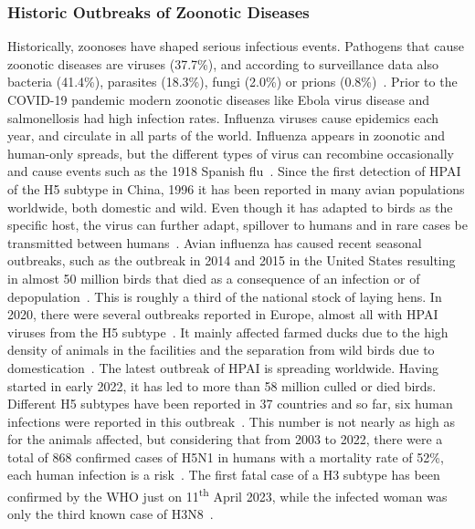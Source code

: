 \subsubsection*{Historic Outbreaks of Zoonotic Diseases}
Historically, zoonoses have shaped serious infectious events. Pathogens that cause zoonotic diseases are viruses (37.7\%), and according to surveillance data also bacteria (41.4\%), parasites (18.3\%), fungi (2.0\%) or prions (0.8\%)~\cite{salyer2017prioritizing}. Prior to the \ac{COVID-19} pandemic modern zoonotic diseases like Ebola virus disease and salmonellosis had high infection rates. Influenza viruses cause epidemics each year, and circulate in all parts of the world. Influenza appears in zoonotic and human-only spreads, but the different types of virus can recombine occasionally and cause events such as the 1918 Spanish flu~\cite{garten2009antigenic, gibbs2001recombination}. Since the first detection of \ac{HPAI} of the H5 subtype in China, 1996 it has been reported in many avian populations worldwide, both domestic and wild. Even though it has adapted to birds as the specific host, the virus can further adapt, spillover to humans and in rare cases be transmitted between humans~\cite{webster1992evolution}. Avian influenza has caused recent seasonal outbreaks, such as the outbreak in 2014 and 2015 in the United States resulting in almost 50 million birds that died as a consequence of an infection or of depopulation~\cite{lee2016highly}. This is roughly a third of the national stock of laying hens. In 2020, there were several outbreaks reported in Europe, almost all with \ac{HPAI} viruses from the H5 subtype~\cite{lewis2021emergence}. It mainly affected farmed ducks due to the high density of animals in the facilities and the separation from wild birds due to domestication~\cite{lewis2021emergence}. The latest outbreak of \ac{HPAI} is spreading worldwide. Having started in early 2022, it has led to more than 58 million culled or died birds. Different H5 subtypes have been reported in 37 countries and so far, six human infections were reported in this outbreak~\cite{authority2023avian}. This number is not nearly as high as for the animals affected, but considering that from 2003 to 2022, there were a total of 868 confirmed cases of H5N1 in humans with a mortality rate of 52\%, each human infection is a risk~\cite{whocumu2023}. The first fatal case of a H3 subtype has been confirmed by the \ac{WHO} just on 11\textsuperscript{th} April 2023, while the infected woman was only the third known case of H3N8~\cite{who2023china}.

